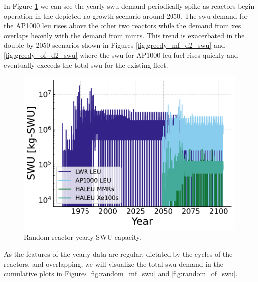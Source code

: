 In Figure \ref{fig:swu_yearly_random} we can see the yearly \gls{swu} demand periodically spike as reactors begin operation in the depicted no growth scenario around 2050. The \gls{swu} demand for the AP1000 \gls{leu} rises above the other two reactors while the demand from \glspl{xe} overlaps heavily with the demand from \glspl{mmr}. This trend is exacerbated in the double by 2050 scenarios shown in Figures \ref{fig:greedy_mf_d2_swu} and \ref{fig:greedy_of_d2_swu} where the \gls{swu} for AP1000 \gls{leu} fuel rises quickly and eventually exceeds the total \gls{swu} for the existing fleet.



\begin{figure}[H]
    \centering
    \includegraphics[scale=0.7]{images/results/swu/multi_drng_swu_by_fuel.pdf}
    \caption{Random reactor yearly SWU capacity.}
    \label{fig:swu_yearly_random}
\end{figure}

As the features of the yearly data are regular, dictated by the cycles of the
reactors, and overlapping, we will visualize the total \gls{swu} demand in the
cumulative plots in Figures \ref{fig:random_mf_swu} and \ref{fig:random_of_swu}.


